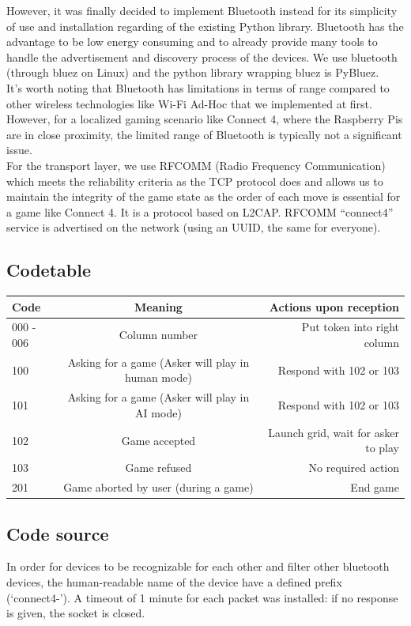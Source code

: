\documentclass[12pt, a4paper, oneside]{report}
\begin{document}
	However, it was finally decided to implement Bluetooth instead for its simplicity of use and installation regarding of the existing Python library. Bluetooth has the advantage to be low energy consuming and to already provide many tools to handle the advertisement and discovery process of the devices. We use bluetooth (through bluez on Linux) and the python library wrapping bluez is PyBluez. \\
	
	It's worth noting that Bluetooth has limitations in terms of range compared to other wireless technologies like Wi-Fi Ad-Hoc that we implemented at first. However, for a localized gaming scenario like Connect 4, where the Raspberry Pis are in close proximity, the limited range of Bluetooth is typically not a significant issue. \\

	For the transport layer, we use RFCOMM (Radio Frequency Communication) which meets the reliability criteria as the TCP protocol does and allows us to maintain the integrity of the game state as the order of each move is essential for a game like Connect 4. It is a protocol based on L2CAP. RFCOMM “connect4” service is advertised on the network (using an UUID, the same for everyone). 

	\subsection{Codetable}
	\begin{tabular}{|l|c|r|}
		\toprule
		Code & Meaning & Actions upon reception \\
		\midrule
		000 - 006 & Column number & Put token into right column \\
		100 & Asking for a game (Asker will play in human mode) & Respond with 102 or 103 \\
		101 & Asking for a game (Asker will play in AI mode) & Respond with 102 or 103 \\
		102 & Game accepted & Launch grid, wait for asker to play \\
		103 & Game refused & No required action \\
		201 & Game aborted by user (during a game) & End game \\
		\bottomrule
	  \end{tabular}

	\subsection{Code source}
	In order for devices to be recognizable for each other and filter other bluetooth devices, the human-readable name of the device have a defined prefix (‘connect4-’). A timeout of 1 minute for each packet was installed: if no response is given, the socket is closed. \\
\end{document}
